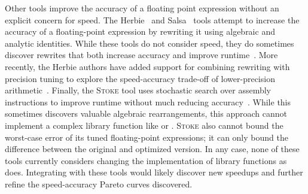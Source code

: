 \documentclass[paper.tex]{subfiles}
\begin{document}
Other tools improve the accuracy of a floating point expression without an explicit
  concern for speed.
The Herbie~\cite{herbie} and Salsa~\cite{salsa} tools
  attempt to increase the accuracy of a floating-point expression
  by rewriting it using algebraic and analytic identities.
While these tools do not consider speed,
  they do sometimes discover rewrites
  that both increase accuracy and improve runtime~\cite{herbie}.
More recently, the Herbie authors have added support
  for combining rewriting with precision tuning
  to explore the speed-accuracy trade-off of lower-precision arithmetic~\cite{pherbie}.
Finally, the \textsc{Stoke} tool uses stochastic search over assembly instructions
  to improve runtime without much reducing accuracy~\cite{stoke-fp}.
While this sometimes discovers valuable algebraic rearrangements,
  this approach cannot implement a complex library function like  or .
\textsc{Stoke} also cannot bound the worst-case error
  of its tuned floating-point expressions;
  it can only bound the difference between the original and optimized version.
In any case, none of these tools currently considers
  changing the implementation of library functions as \name does.
Integrating \name with these tools
  would likely discover new speedups and further refine
  the speed-accuracy Pareto curves discovered.
\end{document}
